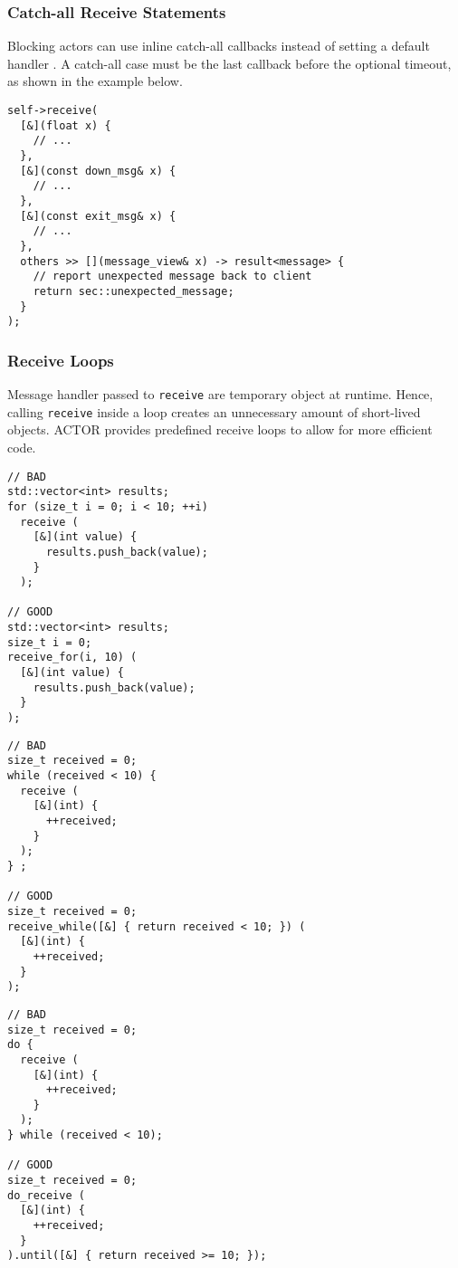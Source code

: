 \subsubsection{Catch-all Receive Statements}
\label{catch-all}

Blocking actors can use inline catch-all callbacks instead of setting a default
handler . A catch-all case must be the last callback
before the optional timeout, as shown in the example below.

\begin{lstlisting}
self->receive(
  [&](float x) {
    // ...
  },
  [&](const down_msg& x) {
    // ...
  },
  [&](const exit_msg& x) {
    // ...
  },
  others >> [](message_view& x) -> result<message> {
    // report unexpected message back to client
    return sec::unexpected_message;
  }
);
\end{lstlisting}

\clearpage
\subsubsection{Receive Loops}
\label{receive-loop}

Message handler passed to \lstinline^receive^ are temporary object at runtime.
Hence, calling \lstinline^receive^ inside a loop creates an unnecessary amount
of short-lived objects. ACTOR provides predefined receive loops to allow for
more efficient code.

\begin{lstlisting}
// BAD
std::vector<int> results;
for (size_t i = 0; i < 10; ++i)
  receive (
    [&](int value) {
      results.push_back(value);
    }
  );

// GOOD
std::vector<int> results;
size_t i = 0;
receive_for(i, 10) (
  [&](int value) {
    results.push_back(value);
  }
);
\end{lstlisting}

\begin{lstlisting}
// BAD
size_t received = 0;
while (received < 10) {
  receive (
    [&](int) {
      ++received;
    }
  );
} ;

// GOOD
size_t received = 0;
receive_while([&] { return received < 10; }) (
  [&](int) {
    ++received;
  }
);
\end{lstlisting}
\clearpage

\begin{lstlisting}
// BAD
size_t received = 0;
do {
  receive (
    [&](int) {
      ++received;
    }
  );
} while (received < 10);

// GOOD
size_t received = 0;
do_receive (
  [&](int) {
    ++received;
  }
).until([&] { return received >= 10; });
\end{lstlisting}

